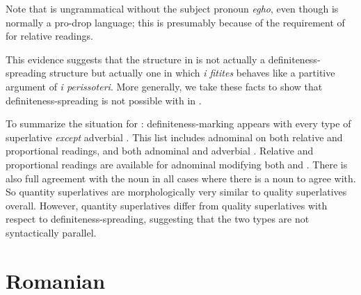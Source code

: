 \documentclass[output=paper
,modfonts
,nonflat]{langsci/langscibook}
\begin{document}
\z

\z 

Note that  is ungrammatical without the subject pronoun \textit{egho}, even though  is normally a pro-drop language; this is presumably because of the requirement of  for relative readings.

This evidence  suggests that the structure in  is not actually a definiteness-spreading structure but actually one in which \textit{i fitites} behaves like a partitive argument of \textit{i perissoteri}.  More generally, we take these facts to show that definiteness-spreading is not possible with  in .

To summarize the situation for : definiteness-marking appears with every type of superlative \textit{except} adverbial . This list includes adnominal  on both relative and proportional readings, and both adnominal and adverbial . Relative and proportional readings are available for adnominal  modifying both  and . There is also full agreement with the noun in all cases where there is a noun to agree with. So quantity superlatives are morphologically very similar to quality superlatives overall. However, quantity superlatives differ from quality superlatives with respect to definiteness-spreading, suggesting that the two types are not syntactically parallel. 


\section{Romanian} \label{sec:coppockstrand:3}\largerpage[2]
\end{document}
